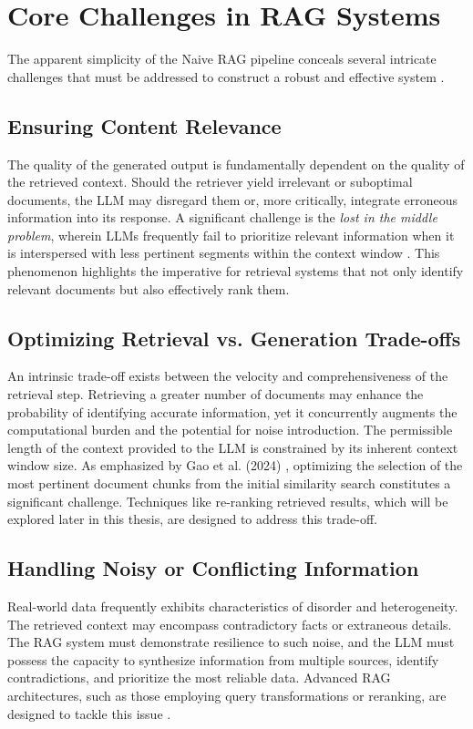 \section{Core Challenges in RAG Systems}
The apparent simplicity of the Naive RAG pipeline conceals several intricate challenges that must be addressed to construct a robust and effective system \autocite{gao2024retrievalaugmentedgenerationlargelanguage}.

\subsection{Ensuring Content Relevance}
The quality of the generated output is fundamentally dependent on the quality of the retrieved context. Should the retriever yield irrelevant or suboptimal documents, the LLM may disregard them or, more critically, integrate erroneous information into its response. A significant challenge is the \textit{lost in the middle problem}, wherein LLMs frequently fail to prioritize relevant information when it is interspersed with less pertinent segments within the context window \autocite{liu2023lostmiddlelanguagemodels}. This phenomenon highlights the imperative for retrieval systems that not only identify relevant documents but also effectively rank them.

\subsection{Optimizing Retrieval vs. Generation Trade-offs}
An intrinsic trade-off exists between the velocity and comprehensiveness of the retrieval step. Retrieving a greater number of documents may enhance the probability of identifying accurate information, yet it concurrently augments the computational burden and the potential for noise introduction. The permissible length of the context provided to the LLM is constrained by its inherent context window size. As emphasized by Gao et al. (2024) \autocite{gao2024retrievalaugmentedgenerationlargelanguage}, optimizing the selection of the most pertinent document chunks from the initial similarity search constitutes a significant challenge. Techniques like re-ranking retrieved results, which will be explored later in this thesis, are designed to address this trade-off.

\subsection{Handling Noisy or Conflicting Information}
Real-world data frequently exhibits characteristics of disorder and heterogeneity. The retrieved context may encompass contradictory facts or extraneous details. The RAG system must demonstrate resilience to such noise, and the LLM must possess the capacity to synthesize information from multiple sources, identify contradictions, and prioritize the most reliable data. Advanced RAG architectures, such as those employing query transformations or reranking, are designed to tackle this issue \autocite{gao2024retrievalaugmentedgenerationlargelanguage, Rackauckas_2024}.

